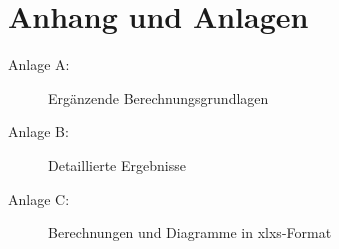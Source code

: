 \cleardoublepage
\appendix
{}
\chapter*{Anhang und Anlagen}

\begin{description}
\item[Anlage A:] Ergänzende Berechnungsgrundlagen\hfill \\
\item[Anlage B:] Detaillierte Ergebnisse \hfill \\
\item[Anlage C:] Berechnungen und Diagramme in xlxs-Format\hfill \\
\end{description}
